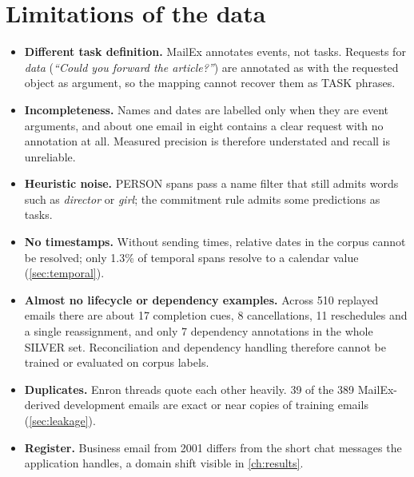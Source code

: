 \section{Limitations of the data}
\label{sec:datalimits}
\begin{itemize}
  \item \textbf{Different task definition.} MailEx annotates events, not tasks. Requests for \emph{data} (\emph{``Could you forward the article?''}) are annotated as  with the requested object as argument, so the mapping cannot recover them as TASK phrases.
  \item \textbf{Incompleteness.} Names and dates are labelled only when they are event arguments, and about one email in eight contains a clear request with no annotation at all. Measured precision is therefore understated and recall is unreliable.
  \item \textbf{Heuristic noise.} PERSON spans pass a name filter that still admits words such as \emph{director} or \emph{girl}; the commitment rule admits some predictions as tasks.
  \item \textbf{No timestamps.} Without sending times, relative dates in the corpus cannot be resolved; only 1.3\% of temporal spans resolve to a calendar value (\cref{sec:temporal}).
  \item \textbf{Almost no lifecycle or dependency examples.} Across 510 replayed emails there are about 17 completion cues, 8 cancellations, 11 reschedules and a single reassignment, and only 7 dependency annotations in the whole SILVER set. Reconciliation and dependency handling therefore cannot be trained or evaluated on corpus labels.
  \item \textbf{Duplicates.} Enron threads quote each other heavily. 39 of the 389 MailEx-derived development emails are exact or near copies of training emails (\cref{sec:leakage}).
  \item \textbf{Register.} Business email from 2001 differs from the short chat messages the application handles, a domain shift visible in \cref{ch:results}.
\end{itemize}
